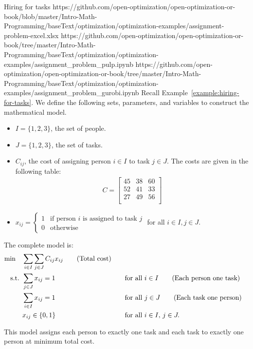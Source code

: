 \begin{examplewithallcode}{Hiring for tasks}
{https://github.com/open-optimization/open-optimization-or-book/blob/master/Intro-Math-Programming/baseText/optimization/optimization-examples/assignment-problem-excel.xlsx}
{https://github.com/open-optimization/open-optimization-or-book/tree/master/Intro-Math-Programming/baseText/optimization/optimization-examples/assignment_problem_pulp.ipynb}
{https://github.com/open-optimization/open-optimization-or-book/tree/master/Intro-Math-Programming/baseText/optimization/optimization-examples/assignment_problem_gurobi.ipynb}
Recall Example~\ref{example:hiring-for-tasks}.  
We define the following sets, parameters, and variables to construct the mathematical model.

\begin{itemize}
    \item $I = \{1, 2, 3\}$, the set of people.
    \item $J = \{1, 2, 3\}$, the set of tasks.
\end{itemize}

\begin{itemize}
    \item $C_{ij}$, the cost of assigning person $i \in I$ to task $j \in J$. The costs are given in the following table:
    \begin{align*}
        C = \begin{bmatrix}
            45 & 38 & 60 \\
            52 & 41 & 33 \\
            27 & 49 & 56 \\
        \end{bmatrix}
    \end{align*}
\end{itemize}

\begin{itemize}
    \item $x_{ij} = 
    \begin{cases} 
    1 & \text{if person } i \text{ is assigned to task } j \\
    0 & \text{otherwise}
    \end{cases}$ for all $i \in I, j \in J$.
\end{itemize}


The complete model is:
\begin{align*}
\min \quad & \sum_{i \in I} \sum_{j \in J} C_{ij} x_{ij}   \tag{Total cost} \\
\mbox{ s.t. }        & \sum_{j \in J} x_{ij} = 1 &&\quad \mbox{for all } i \in I   \tag{Each person one task} \\
             & \sum_{i \in I} x_{ij} = 1 &&\quad \mbox{for all } j \in J   \tag{Each task one person} \\
             & x_{ij} \in \{0,1\} &&\quad \mbox{for all } i \in I,\, j \in J.
\end{align*}

This model assigns each person to exactly one task and each task to exactly one person at minimum total cost.

\end{examplewithallcode}

